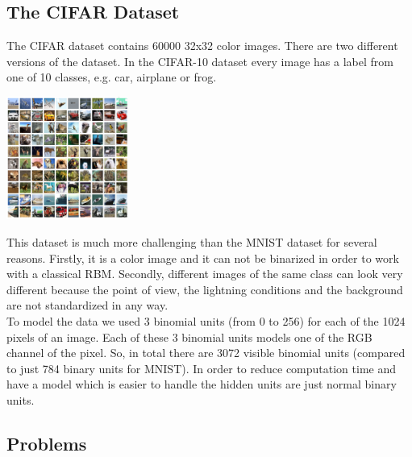 \documentclass[a4paper]{scrartcl}
\begin{document}
\subsection{The CIFAR Dataset}
The CIFAR dataset contains 60000 32x32 color images. There are two different versions of the dataset. In the CIFAR-10 dataset every image has a label from one of 10 classes, e.g. car, airplane or frog. 
\begin{center}
\includegraphics[width=4cm]{images/cifar-10.png}
\end{center} 
This dataset is much more challenging than the MNIST dataset for several reasons. Firstly, it is a color image and it can not be binarized in order to work with a classical RBM. Secondly, different images of the same class can look very different because the point of view, the lightning conditions and the background are not standardized in any way. \\
To model the data we used 3 binomial units (from 0 to 256) for each of the 1024 pixels of an image. Each of these 3 binomial units models one of the RGB channel of the pixel. So, in total there are 3072 visible binomial units (compared to just 784 binary units for MNIST).
In order to reduce computation time and have a model which is easier to handle the hidden units are just normal binary units.

\subsection{Problems}

\newpage
\end{document}
